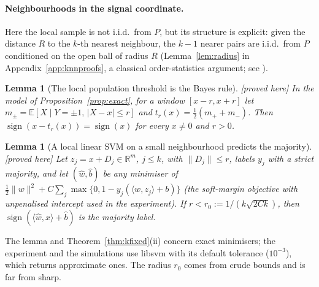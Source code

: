\documentclass[11pt,a4paper]{article}
\theoremstyle{plain}
\newtheorem{lemma}[theorem]{Lemma}
\theoremstyle{definition}
\theoremstyle{remark}
\newcommand{\R}{\mathbb{R}}
\newcommand{\E}{\mathbb{E}}
\newcommand{\sgn}{\operatorname{sign}}
\newcommand{\status}[1]{\textsf{\small [#1]}}
\begin{document}
\paragraph{Neighbourhoods in the signal coordinate.} Here the local sample is not i.i.d.\ from $P$, but its structure is explicit: given the distance $R$ to the $k$-th nearest neighbour, the $k-1$ nearer pairs are i.i.d.\ from $P$ conditioned on the open ball of radius $R$ (Lemma~\ref{lem:radius} in Appendix~\ref{app:knnproofs}, a classical order-statistics argument; see \citet{biau2015}).

\begin{lemma}[The local population threshold is the Bayes rule]\label{lem:popsign}\status{proved here}
In the model of Proposition~\ref{prop:exact}, for a window $[x-r,x+r]$ let $m_\pm=\E[X\mid Y=\pm1,\,|X-x|\le r]$ and $t_r(x)=\tfrac12(m_++m_-)$. Then $\sgn(x-t_r(x))=\sgn(x)$ for every $x\neq0$ and $r>0$.
\end{lemma}

\begin{lemma}[A local linear SVM on a small neighbourhood predicts the majority]\label{lem:majority}\status{proved here}
Let $z_j=x+D_j\in\R^m$, $j\le k$, with $\|D_j\|\le r$, labels $y_j$ with a strict majority, and let $(\hat w,\hat b)$ be any minimiser of $\tfrac12\|w\|^2+C\sum_j\max\{0,1-y_j(\langle w,z_j\rangle+b)\}$ (the soft-margin objective with unpenalised intercept used in the experiment). If $r<r_0:=1/(k\sqrt{2Ck})$, then $\sgn(\langle\hat w,x\rangle+\hat b)$ is the majority label.
\end{lemma}

The lemma and Theorem~\ref{thm:kfixed}(ii) concern exact minimisers; the experiment and the simulations use libsvm with its default tolerance ($10^{-3}$), which returns approximate ones. The radius $r_0$ comes from crude bounds and is far from sharp.
\end{document}
